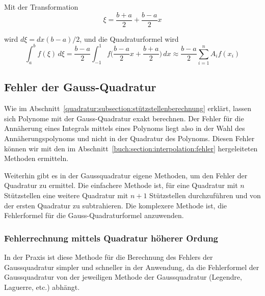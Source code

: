 \noindent
Mit der Transformation
\begin{equation}
    \xi = \frac{b + a}{2} + \frac{b - a}{2} x    
\end{equation}

\noindent
wird $d\xi = dx(b - a)/2$, und die Quadraturformel wird
\begin{equation}
    \int_{a}^{b}f(\xi)\,d\xi 
    =
    \frac{b - a}{2} \int_{-1}^{1}f\bigg(\frac{b - a}{2}x + \frac{b + a}{2}\bigg)\, dx 
    \approx
     \frac{b - a}{2} \sum_{i=1}^{n} A_{i}f(x_{i})
\end{equation}
    
\newpage

\subsection{Fehler der Gauss-Quadratur
\label{quadratur:subsection:gaussfehler}}
Wie im Abschnitt~\ref{quadratur:subsection:stützstellenberechnung} erklärt,
lassen sich Polynome mit der Gauss-Quadratur exakt berechnen. 
Der Fehler für die Annäherung eines Integrals mittels eines Polynoms liegt
also in der Wahl des Annäherungspolynoms und nicht in der Quadratur des Polynoms.
Diesen Fehler können wir mit den im Abschnitt~\ref{buch:section:interpolation:fehler}
hergeleiteten Methoden ermitteln.
\newline

\noindent
Weiterhin gibt es in der Gaussquadratur eigene Methoden, 
um den Fehler der Quadratur zu ermittel. 
Die einfachere Methode ist, für eine Quadratur mit $n$ Stützstellen eine weitere
Quadratur mit $n+1$ Stützstellen durchzuführen und von der ersten Quadratur zu
subtrahieren. Die komplexere Methode ist, 
die Fehlerformel für die Gauss-Quadraturformel anzuwenden. 

\subsubsection{Fehlerrechnung mittels Quadratur höherer Ordung}

In der Praxis ist diese Methode für die Berechnung des Fehlers der Gaussquadratur
simpler und schneller in der Anwendung, da die Fehlerformel der Gaussquadratur
von der jeweiligen Methode der Gaussquadratur (Legendre, Laguerre, etc.) abhängt.
\newline

